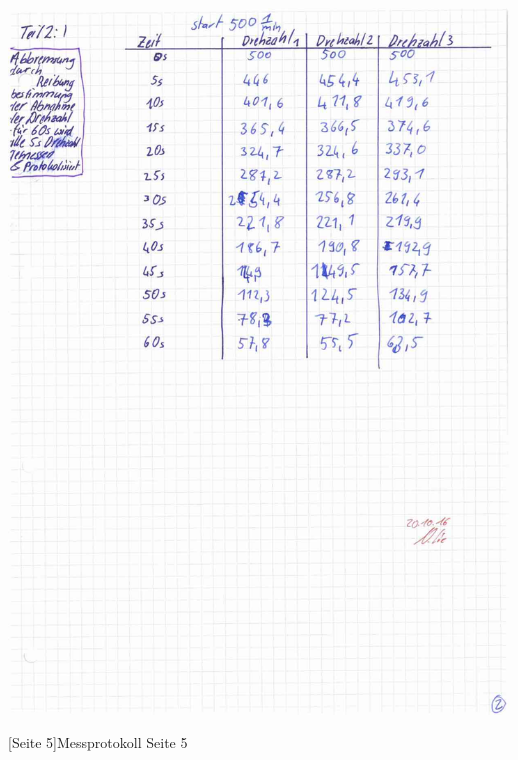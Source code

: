 \documentclass[12pt,a4paper,]{scrreprt}
\begin{document}
        \begin{center}
    		\includegraphics[scale=0.32]{5.jpg}
    	\end{center}
    	[Seite 5]{Messprotokoll Seite 5}
    	
	\pagebreak
\end{document}
